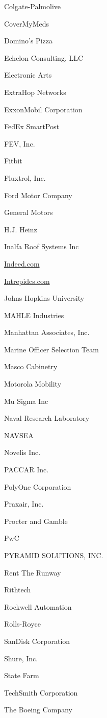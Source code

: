 \documentclass[twoside]{article}
\begin{document}
\begin{center}
\begin{multicols}{5}
\begin{FlushLeft}
\begin{compactitem}
\item Colgate-Palmolive
\item CoverMyMeds
\item Domino's Pizza
\item Echelon Consulting, LLC
\item Electronic Arts
\item ExtraHop Networks
\item ExxonMobil Corporation
\item FedEx SmartPost
\item FEV, Inc.
\item Fitbit
\item Fluxtrol, Inc.
\item Ford Motor Company
\item General Motors
\item H.J. Heinz
\item Inalfa Roof Systems Inc
\item \url{Indeed.com}
\item \url{Intrepidcs.com}
\item Johns Hopkins University
\item MAHLE Industries
\item Manhattan Associates, Inc.
\item Marine Officer Selection Team
\item Masco Cabinetry
\item Motorola Mobility
\item Mu Sigma Inc
\item Naval Research Laboratory
\item NAVSEA
\item Novelis Inc.
\item PACCAR Inc.
\item PolyOne Corporation
\item Praxair, Inc.
\item Procter and Gamble
\item PwC
\item PYRAMID SOLUTIONS, INC.
\item Rent The Runway
\item Rithtech
\item Rockwell Automation
\item Rolls-Royce
\item SanDisk Corporation
\item Shure, Inc.
\item State Farm
\item TechSmith Corporation
\item The Boeing Company

\end{compactitem}
\end{FlushLeft}
\end{multicols}
\end{center}
\end{document}
